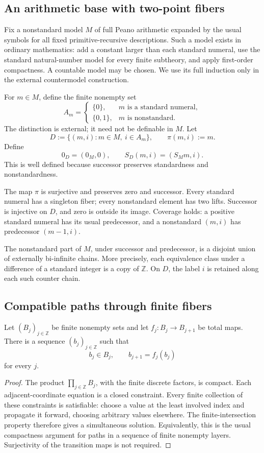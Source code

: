 \subsection{An arithmetic base with two-point fibers}

Fix a nonstandard model \(M\) of full Peano arithmetic expanded by the usual symbols for all fixed primitive-recursive descriptions. Such a model exists in ordinary mathematics: add a constant larger than each standard numeral, use the standard natural-number model for every finite subtheory, and apply first-order compactness. A countable model may be chosen. We use its full induction only in the external countermodel construction.

For \(m\in M\), define the finite nonempty set
\[
A_m=
\begin{cases}
\{0\},&m\text{ is a standard numeral},\\
\{0,1\},&m\text{ is nonstandard}.
\end{cases}
\]
The distinction is external; it need not be definable in \(M\).
Let
\[
D:=\{(m,i):m\in M,\ i\in A_m\},\qquad
\pi(m,i):=m.
\]
Define
\[
0_D=(0_M,0),\qquad
S_D(m,i)=(S_Mm,i).
\]
This is well defined because successor preserves standardness and nonstandardness.

The map \(\pi\) is surjective and preserves zero and successor. Every standard numeral has a singleton fiber; every nonstandard element has two lifts. Successor is injective on \(D\), and zero is outside its image. Coverage holds: a positive standard numeral has its usual predecessor, and a nonstandard \((m,i)\) has predecessor \((m-1,i)\).

The nonstandard part of \(M\), under successor and predecessor, is a disjoint union of externally bi-infinite chains. More precisely, each equivalence class under a difference of a standard integer is a copy of \(\mathbb Z\). On \(D\), the label \(i\) is retained along each such counter chain.

\subsection{Compatible paths through finite fibers}

\begin{lemma}\label{zi:path}
Let \((B_j)_{j\in\mathbb Z}\) be finite nonempty sets and let
\(f_j:B_j\to B_{j+1}\) be total maps. There is a sequence
\((b_j)_{j\in\mathbb Z}\) such that
\[
b_j\in B_j,\qquad b_{j+1}=f_j(b_j)
\]
for every \(j\).
\end{lemma}
\begin{proof}
The product \(\prod_{j\in\mathbb Z}B_j\), with the finite discrete factors, is compact. Each adjacent-coordinate equation is a closed constraint. Every finite collection of these constraints is satisfiable: choose a value at the least involved index and propagate it forward, choosing arbitrary values elsewhere. The finite-intersection property therefore gives a simultaneous solution. Equivalently, this is the usual compactness argument for paths in a sequence of finite nonempty layers. Surjectivity of the transition maps is not required.
\end{proof}

